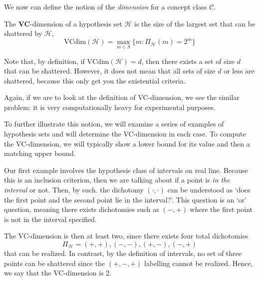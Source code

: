 We now can define the notion of the \textit{dimension} for a concept class $\mathcal{C}$. 
\begin{definition}[VC-dimension]
    The \textbf{VC}-dimension of a hypothesis set $\mathcal{H}$ is the size of the largest set that can be shattered by $\mathcal{H}$, 
    \begin{equation}
        \mathrm{VCdim}(\mathcal{H}) = \max_{m\in S} \{m: \Pi_{\mathcal{H}}(m)=2^{m}\}
    \end{equation}
\end{definition}
Note that, by definition, if $\mathrm{VCdim}(\mathcal{H}) =d$, then there exists a set of size $d$ that can be shattered. However, it does not mean that all sets of size $d$ or less are shattered, because this only get you the existential criteria. 

Again, if we are to look at the definition of VC-dimension, we see the similar problem: it is very computationally heavy for experimental purposes. 

To further illustrate this notion, we will examine a series of examples of hypothesis sets and will determine the VC-dimension in each case. To compute the VC-dimension, we will typically show a lower bound for its value and then a matching upper bound. 

\begin{example}
    Our first example involves the hypothesis class of intervals on real line. Because this is an inclusion criterion, then we are talking about if a point is \textit{in the interval} or not. Then, by such. the dichotomy $(\cdot,\cdot)$ can be understood as `does the first point and the second point lie in the interval?'. This question is an `or' question, meaning there exists dichotomies such as $(-,+)$ where the first point is not in the interval specified. 
    
    The VC-dimension is then at least two, since there exists four total dichotomies $$\Pi_{\mathcal{H}}=(+,+),(-,-),(+,-),(-,+)$$ that can be realized. In contrast, by the definition of intervals, no set of three points can be shattered since the $(+,-,+)$ labelling cannot be realized. Hence, we say that the VC-dimension is 2. 
\end{example}

